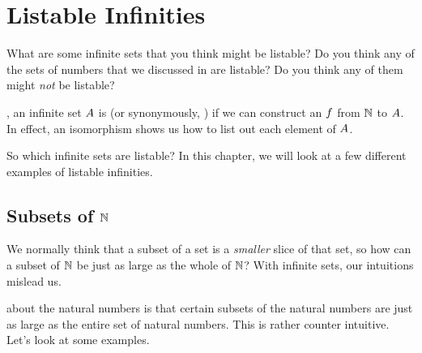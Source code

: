 \documentclass[../../../main.tex]{subfiles}
\begin{document}
\chapter{Listable Infinities}
\label{ch:listable-infinities}

\begin{ponder}
  What are some infinite sets that you think might be listable? Do you think any of the sets of numbers that we discussed in  are listable? Do you think any of them might \emph{not} be listable?
\end{ponder}

, an infinite set $A$ is  (or synonymously, ) if we can construct an  $f$ from $\Nats/$ to $A$. In effect, an isomorphism shows us how to list out each element of $A$.

So which infinite sets are listable? In this chapter, we will look at a few different examples of listable infinities.


\section{Subsets of $\Nats/$}

\begin{aside}
  \begin{remark}
    We normally think that a subset of a set is a \emph{smaller} slice of that set, so how can a subset of $\Nats/$ be just as large as the whole of $\Nats/$? With infinite sets, our intuitions mislead us. 
  \end{remark}
\end{aside}

 about the natural numbers is that certain subsets of the natural numbers are just as large as the entire set of natural numbers. This is rather counter intuitive. Let's look at some examples.
\end{document}
